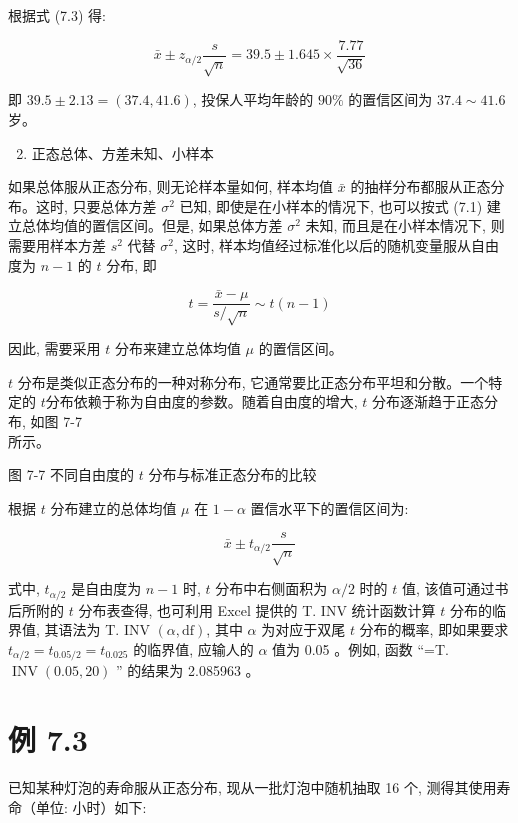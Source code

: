 \documentclass[10pt]{article}
\begin{document}
\begin{CJK*}{UTF8}{bsmi}
根据式 (7.3) 得:

$$
\bar{x} \pm z_{\alpha / 2} \frac{s}{\sqrt{n}}=39.5 \pm 1.645 \times \frac{7.77}{\sqrt{36}}
$$

即 $39.5 \pm 2.13=(37.4,41.6)$, 投保人平均年龄的 $90 \%$ 的置信区间为 $37.4 \sim 41.6$ 岁。

\begin{enumerate}
  \setcounter{enumi}{1}
  \item 正态总体、方差未知、小样本
\end{enumerate}

如果总体服从正态分布, 则无论样本量如何, 样本均值 $\bar{x}$ 的抽样分布都服从正态分布。这时, 只要总体方差 $\sigma^{2}$ 已知, 即使是在小样本的情况下, 也可以按式 (7.1) 建立总体均值的置信区间。但是, 如果总体方差 $\sigma^{2}$ 未知, 而且是在小样本情况下, 则需要用样本方差 $s^{2}$ 代替 $\sigma^{2}$, 这时, 样本均值经过标准化以后的随机变量服从自由度为 $n-1$ 的 $t$ 分布, 即


\begin{equation*}
t=\frac{\bar{x}-\mu}{s / \sqrt{n}} \sim t(n-1) \tag{7.4}
\end{equation*}


因此, 需要采用 $t$ 分布来建立总体均值 $\mu$ 的置信区间。

$t$ 分布是类似正态分布的一种对称分布, 它通常要比正态分布平坦和分散。一个特定的 $t$分布依赖于称为自由度的参数。随着自由度的增大, $t$ 分布逐渐趋于正态分布, 如图 7-7\\
所示。

\begin{center}
\end{center}

图 7-7 不同自由度的 $t$ 分布与标准正态分布的比较

根据 $t$ 分布建立的总体均值 $\mu$ 在 $1-\alpha$ 置信水平下的置信区间为:


\begin{equation*}
\bar{x} \pm t_{\alpha / 2} \frac{s}{\sqrt{n}} \tag{7.5}
\end{equation*}


式中, $t_{\alpha / 2}$ 是自由度为 $n-1$ 时, $t$ 分布中右侧面积为 $\alpha / 2$ 时的 $t$ 值, 该值可通过书后所附的 $t$ 分布表查得, 也可利用 Excel 提供的 T. INV 统计函数计算 $t$ 分布的临界值, 其语法为 T. INV $(\alpha, \mathrm{df})$, 其中 $\alpha$ 为对应于双尾 $t$ 分布的概率, 即如果要求 $t_{\alpha / 2}=t_{0.05 / 2}=t_{0.025}$ 的临界值, 应输人的 $\alpha$ 值为 0.05 。例如, 函数 “=T. $\operatorname{INV}(0.05,20)$ ” 的结果为 2.085963 。

\section*{例 7.3}
已知某种灯泡的寿命服从正态分布, 现从一批灯泡中随机抽取 16 个, 测得其使用寿命（单位: 小时）如下:


\end{CJK*}
\end{document}
